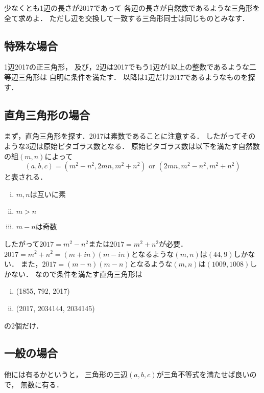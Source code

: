 \documentclass{jarticle}
\begin{document}
\begin{screen}
少なくとも1辺の長さが2017であって
各辺の長さが自然数であるような三角形を全て求めよ．
ただし辺を交換して一致する三角形同士は同じものとみなす．
\end{screen}

\subsection{特殊な場合}
1辺2017の正三角形，
及び，2辺は2017でもう1辺が1以上の整数であるような二等辺三角形は
自明に条件を満たす．
以降は1辺だけ2017であるようなものを探す．

\subsection{直角三角形の場合}
まず，直角三角形を探す．2017は素数であることに注意する．
したがってそのような3辺は原始ピタゴラス数となる．
原始ピタゴラス数は以下を満たす自然数の組$(m,n)$によって
\[ (a, b, c) = (m^2−n^2, 2mn, m^2+n^2) \mbox{~or~} (2mn, m^2−n^2, m^2+n^2) \]
と表される．
\begin{enumerate}[i)]
    \item $m,n$は互いに素
    \item $m>n$
    \item $m-n$は奇数
\end{enumerate}
したがって$2017=m^2-n^2$または$2017=m^2+n^2$が必要．
$2017=m^2+n^2=(m+in)(m-in)$となるような$(m,n)$は$(44,9)$しかない．
また，$2017=(m-n)(m-n)$となるような$(m,n)$は$(1009, 1008)$しかない．
なので条件を満たす直角三角形は
\begin{enumerate}[i)]
    \item (1855, 792, 2017)
    \item (2017, 2034144, 2034145)
\end{enumerate}
の2個だけ．

\subsection{一般の場合}
他には有るかというと，
三角形の三辺$(a,b,c)$が三角不等式を満たせば良いので，
無数に有る．
\end{document}
